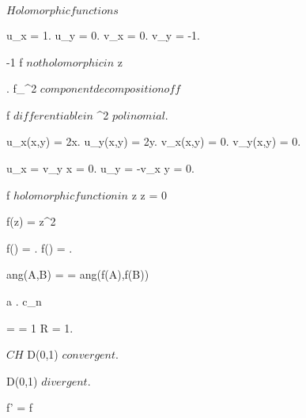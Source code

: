 \documentclass[../Main/main]{subfiles}
\begin{document}
\unit{ $ Holomorphic functions $ }
{
	
	{
		{
		}
		{
			u_x = 1.
			u_y = 0.
			v_x = 0.
			v_y = -1.

			{
				-1  \imp f $ not holomorphic in $ z
			}
		}
	}


	{
		{
			.
			f_{\R^2} $ component decomposition of f $
		}
		{
			f $ differentiable in $ \R^2 $ polinomial $.
			{
				u_x(x,y) = 2x.
				u_y(x,y) = 2y.
				v_x(x,y) = 0.
				v_y(x,y) = 0.

				u_x = v_y \ifandonlyif x = 0.
				u_y = -v_x \ifandonlyif y = 0.

				f $ holomorphic function in $ z \ifandonlyif z = 0
			}
		}
	}


	{
		{
			f(z) = z^2
		}
		{
			f() = .
			f() = .

			ang(A,B) = \pi {} = ang(f(A),f(B))
		}
	}


	{
		{
			a .
			c_n \as {}
		}
		{
			 =  = 1 \imp R = 1.

			$CH$ \imp D(0,1) $ convergent $.

			\C \setminus D(0,1) $ divergent $.

			f' = f
		}
	}
}
\end{document}
